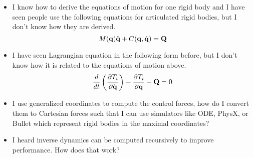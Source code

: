 \begin{itemize}
\item I know how to derive the equations of motion for one rigid body
  and I have seen people use the following equations for articulated
  rigid bodies, but I don't know how they are derived.
\begin{equation}
M(\mathbf{q}) \ddot{\mathbf{q}} + C(\mathbf{q}, \dot{\mathbf{q}})  = \mathbf{Q} \nonumber
\end{equation}

\item I have seen Lagrangian equation in the following form before, but I
  don't know how it is related to the equations of motion above.
\begin{equation}\label{eq:lagrangian_dyn}
    \frac{d}{dt} \left( \frac{\partial T_i}{\partial
    \dot{\mathbf{q}}} \right) - \frac{\partial T_i}{\partial
    \mathbf{q}} - \mathbf{Q} = 0 \nonumber
\end{equation}

\item I use generalized coordinates to compute the control forces, how do I convert them to Cartesian forces such that I can use simulators like ODE, PhysX, or Bullet which represent rigid bodies in the maximal coordinates?

\item I heard inverse dynamics can be computed recursively to improve performance. How does that work?
\end{itemize}

